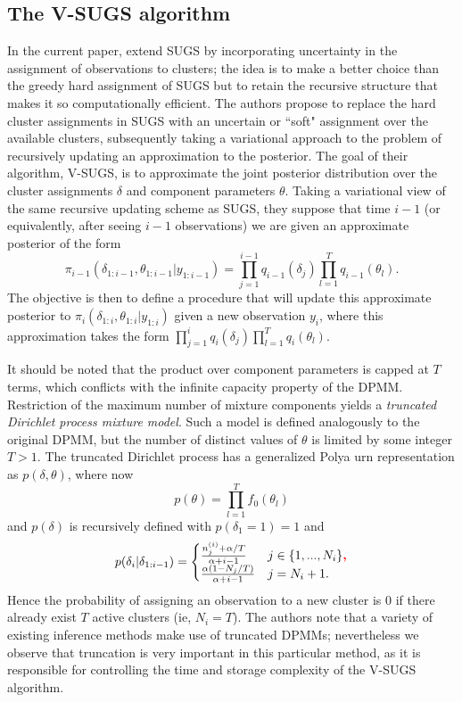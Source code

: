 \documentclass{uwstat572}
\newcommand{\vmadd}[1]{\textbf{\color{red}{#1}}}
\begin{document}
\subsection{The V-SUGS algorithm}

In the current paper, \cite{zhang} extend SUGS by incorporating uncertainty in the assignment of observations to clusters; the idea is to make a better choice than the greedy hard assignment of SUGS but to retain the recursive structure that makes it so computationally efficient. The authors propose to replace the hard cluster assignments in SUGS with an uncertain or ``soft" assignment over the available clusters, subsequently taking a variational approach to the problem of recursively updating an approximation to the posterior. The goal of their algorithm, V-SUGS, is to approximate the joint posterior distribution over the cluster assignments $\delta$ and component parameters $\theta$. Taking a variational view of the same recursive updating scheme as SUGS, they suppose that \vmadd{at} time $i-1$ (or equivalently, after seeing $i-1$ observations) we are given an approximate posterior of the form
$$ \pi_{i-1}(\delta_{1:i-1},\theta_{1:i-1} | y_{1:i-1}) = \prod_{j=1}^{i-1} q_{i-1}(\delta_j) \prod_{l=1}^T q_{i-1}(\theta_l).$$
The objective is then to define a procedure that will update this approximate posterior to $\pi_{i}(\delta_{1:i},\theta_{1:i} | y_{1:i})$ given a new observation $y_i$, where this approximation takes the form $\prod_{j=1}^{i} q_{i}(\delta_j) \prod_{l=1}^T q_{i}(\theta_l)$.

It should be noted that the product over component parameters is capped at $T$ terms, which conflicts with the infinite capacity property of the DPMM. Restriction of the maximum number of mixture components yields a \emph{truncated Dirichlet process mixture model}. Such a model is defined analogously to the original DPMM, but the number of distinct values of $\theta$ is limited by some integer $T > 1$. The truncated Dirichlet process has a generalized Polya urn representation as $p(\delta,\theta)$, where now
$$ p(\theta) = \prod_{l=1}^T f_0(\theta_l)$$
and $p(\delta)$ is recursively defined with $p(\delta_1 = 1) =1$ and 
\[ p(\delta_i | \delta_{1:i-1}) = \begin{cases} 
      \frac{n_j^{(i)}+\alpha/T}{\alpha+i-1}& j \in \{1,...,N_i\}\vmadd{,} \\
      \frac{\alpha(1-N_j/T)}{\alpha+i-1} & j = N_i +1.
   \end{cases}
\]
Hence the probability of assigning an observation to a new cluster is $0$ if there already exist $T$ active clusters (ie, $N_i = T$). The authors note that a variety of existing inference methods make use of truncated DPMMs; nevertheless we observe that truncation is very important in this particular method, as it is responsible for controlling the time and storage complexity of the V-SUGS algorithm.
\end{document}
